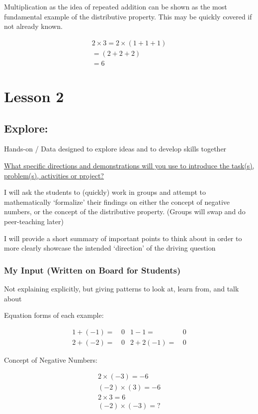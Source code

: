 \documentclass{notes}
\begin{document}
Multiplication as the idea of repeated addition can be shown as the most fundamental example of the distributive property. This may be quickly covered if not already known.

\begin{gather}
    2 \times 3 = 2 \times (1 + 1 + 1)\\
    = (2 + 2 + 2)\\
    = 6
\end{gather}

\section{Lesson 2}

\subsection{Explore:}

Hands-on / Data designed to explore ideas and to develop skills together

\ul{What specific directions and demonstrations will you use to introduce the task(s), problem(s), activities or project?}

I will ask the students to (quickly) work in groups and attempt to mathematically `formalize’ their findings on either the concept of negative numbers, or the concept of the distributive property. (Groups will swap and do peer-teaching later)

I will provide a short summary of important points to think about in order to more clearly showcase the intended `direction’ of the driving question

\subsubsection{My Input (Written on Board for Students)}

Not explaining explicitly, but giving patterns to look at, learn from, and talk about

Equation forms of each example:

\begin{align}
    1 + (-1) =& \,0  &  1 - 1 =& \,0\\
    2 + (-2) =& \,0 & 2 + 2(-1) =& \,0
\end{align}

Concept of Negative Numbers:

\begin{gather}
    2 \times (-3) = -6\\
    (-2) \times (3) = -6\\
    2 \times 3 = 6 \\
    (-2) \times (-3) = \mathord{?}
\end{gather}
\end{document}

